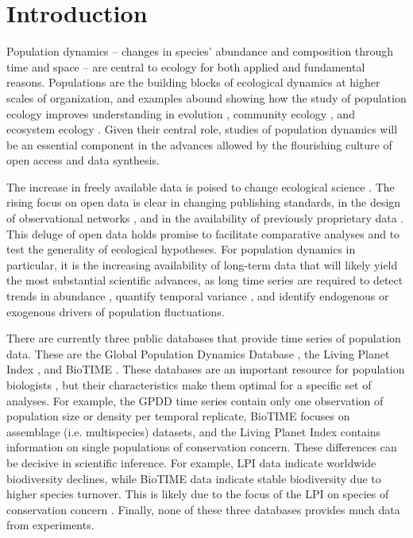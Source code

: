 \documentclass{article}\usepackage[]{graphicx}\usepackage[]{color}
\begin{document}
\newpage
\section*{Introduction}

Population dynamics – changes in species’ abundance and composition through time and space – are central to ecology for both applied and fundamental reasons. Populations are the building blocks of ecological dynamics at higher scales of organization, and examples abound showing how the study of population ecology improves understanding in evolution \citep{Metcalf2007}, community ecology \citep{Levine2009}, and ecosystem ecology \citep{Medvigy2009,Fisher2018}. Given their central role, studies of population dynamics will be an essential component in the advances allowed by the flourishing culture of open access and data synthesis.

The increase in freely available data is poised to change ecological science \citep{Laurance2016}. The rising focus on open data is clear in changing publishing standards, in the design of observational networks \citep{schimel2007neon}, and in the availability of previously proprietary data \citep{Kratz2003,Bechtold2005}. This deluge of open data holds promise to facilitate comparative analyses and to test the generality of ecological hypotheses. For population dynamics in particular, it is the increasing availability of long-term data that will likely yield the most substantial scientific advances, as long time series are required to detect trends in abundance \citep{Lindenmayer2012}, quantify temporal variance \citep{Compagnoni2016}, and identify endogenous \citep{Knape2012} or exogenous \citep{Hampton2013} drivers of population fluctuations.

There are currently three public databases that provide time series of population data. These are the Global Population Dynamics Database \citep[GPDD,][]{Inchausti2001}, the Living Planet Index \citep{loh2005living}, and BioTIME \citep{dornelas2018biotime}. These databases are an important resource for population biologists \citep[e.g.,][]{Knape2012}, but their characteristics make them optimal for a specific set of analyses. For example, the GPDD time series contain only one observation of population size or density per temporal replicate, BioTIME focuses on assemblage (i.e. multispecies) datasets, and the Living Planet Index contains information on single populations of conservation concern. These differences can be decisive in scientific inference. For example, LPI data indicate worldwide biodiversity declines, while BioTIME data indicate stable biodiversity due to higher species turnover. This is likely due to the focus of the LPI on species of conservation concern \citep{dornelas2019balance}. Finally, none of these three databases provides much data from experiments.
\end{document}
